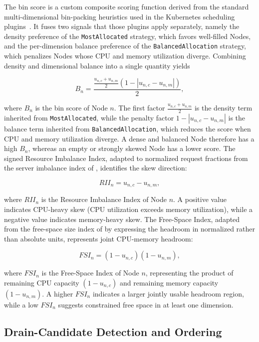 The bin score is a custom composite scoring function derived from the standard multi-dimensional bin-packing heuristics used in the Kubernetes scheduling plugins~\cite{k8s_resource_bin_packing}. It fuses two signals that those plugins apply separately, namely the density preference of the \texttt{MostAllocated} strategy, which favors well-filled Nodes, and the per-dimension balance preference of the \texttt{BalancedAllocation} strategy, which penalizes Nodes whose CPU and memory utilization diverge. Combining density and dimensional balance into a single quantity yields

\[
    B_n =
    \frac{
        \frac{u_{n,c}+u_{n,m}}{2}
        \left(1-\left|u_{n,c}-u_{n,m}\right|\right)
    }{2},
\]

where \(B_n\) is the bin score of Node \(n\). The first factor \(\tfrac{u_{n,c}+u_{n,m}}{2}\) is the density term inherited from \texttt{MostAllocated}, while the penalty factor \(1-|u_{n,c}-u_{n,m}|\) is the balance term inherited from \texttt{BalancedAllocation}, which reduces the score when CPU and memory utilization diverge. A dense and balanced Node therefore has a high \(B_n\), whereas an empty or strongly skewed Node has a lower score. The signed Resource Imbalance Index, adapted to normalized request fractions from the server imbalance index of \cite{guo2025joint}, identifies the skew direction:

\[
    RII_n = u_{n,c} - u_{n,m},
\]

where \(RII_n\) is the Resource Imbalance Index of Node \(n\). A positive value indicates CPU-heavy skew (CPU utilization exceeds memory utilization), while a negative value indicates memory-heavy skew. The Free-Space Index, adapted from the free-space size index of \cite{guo2025joint} by expressing the headroom in normalized rather than absolute units, represents joint CPU-memory headroom:

\[
    FSI_n = (1-u_{n,c})(1-u_{n,m}),
\]

where \(FSI_n\) is the Free-Space Index of Node \(n\), representing the product of remaining CPU capacity \((1-u_{n,c})\) and remaining memory capacity \((1-u_{n,m})\). A higher \(FSI_n\) indicates a larger jointly usable headroom region, while a low \(FSI_n\) suggests constrained free space in at least one dimension.

\subsection{Drain-Candidate Detection and Ordering}
\label{sec:defrag_drain_candidates}

